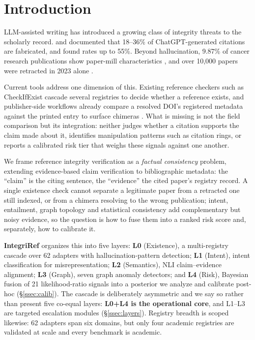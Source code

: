 \documentclass[runningheads]{llncs}
\let\citet\cite
\begin{document}
\section{Introduction}

LLM-assisted writing has introduced a growing class of integrity threats to the scholarly record. \citet{alkaissi2023artificial} and \citet{athaluri2023exploring} documented that 18--36\% of ChatGPT-generated citations are fabricated, and \citet{walters2023fabrication} found rates up to 55\%. Beyond hallucination, 9.87\% of cancer research publications show paper-mill characteristics \cite{scancar2026papermill}, and over 10,000 papers were retracted in 2023 alone \cite{oppenlaender2026retract}.

Current tools address one dimension of this. Existing reference checkers such as CheckIfExist \cite{abbonato2026checkifexist} cascade several registries to decide whether a reference exists, and publisher-side workflows already compare a resolved DOI's registered metadata against the printed entry to surface chimeras \cite{dunford2024bibliography}. What is missing is not the field comparison but its integration: neither judges whether a citation supports the claim made about it, identifies manipulation patterns such as citation rings, or reports a calibrated risk tier that weighs these signals against one another.

We frame reference integrity verification as a \emph{factual consistency} problem, extending evidence-based claim verification \cite{thorne2018fever,wadden2020fact} to bibliographic metadata: the ``claim'' is the citing sentence, the ``evidence'' the cited paper's registry record. A single existence check cannot separate a legitimate paper from a retracted one still indexed, or from a chimera resolving to the wrong publication; intent, entailment, graph topology and statistical consistency add complementary but noisy evidence, so the question is how to fuse them into a ranked risk score and, separately, how to calibrate it.

\textbf{IntegriRef} organizes this into five layers: \textbf{L0} (Existence), a multi-registry cascade over 62 adapters with hallucination-pattern detection; \textbf{L1} (Intent), intent classification for misrepresentation; \textbf{L2} (Semantics), NLI claim--evidence alignment; \textbf{L3} (Graph), seven graph anomaly detectors; and \textbf{L4} (Risk), Bayesian fusion of 21 likelihood-ratio signals into a posterior we analyze and calibrate post-hoc (\S\ref{ssec:calib}). The cascade is deliberately asymmetric and we say so rather than present five co-equal layers: \textbf{L0+L4 is the operational core}, and L1--L3 are targeted escalation modules (\S\ref{ssec:layers}). Registry breadth is scoped likewise: 62 adapters span six domains, but only four academic registries are validated at scale and every benchmark is academic.
\end{document}
